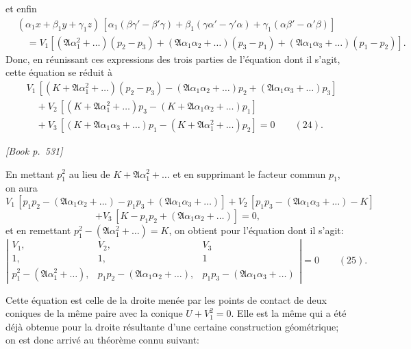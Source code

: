 \documentclass[11pt]{article}
\begin{document}
et enfin
\begin{align*}
&(\alpha_{1}x + \beta_{1}y + \gamma_{1}z)\,[\alpha_{1}(\beta\gamma' - \beta'\gamma) + \beta_{1}(\gamma\alpha' - \gamma'\alpha) + \gamma_{1}(\alpha\beta' - \alpha'\beta)]\\
&\quad = V_{1}[(\mathfrak{A}\alpha_{1}^{2} + \dots)(p_{2} - p_{3}) + (\mathfrak{A}\alpha_{1}\alpha_{2} + \dots)(p_{3} - p_{1}) + (\mathfrak{A}\alpha_{1}\alpha_{3} + \dots)(p_{1} - p_{2})].
\end{align*}
Donc, en r\'eunissant ces expressions des trois parties de l'\'equation dont il s'agit, cette \'equation se r\'eduit \`a
\begin{align*}
&V_{1}\,[(K + \mathfrak{A}\alpha_{1}^{2} + \dots)(p_{2} - p_{3}) - (\mathfrak{A}\alpha_{1}\alpha_{2} + \dots)p_{2} + (\mathfrak{A}\alpha_{1}\alpha_{3} + \dots)p_{3}]\\
&\quad + V_{2}\,[(K + \mathfrak{A}\alpha_{1}^{2} + \dots)p_{3} - (K + \mathfrak{A}\alpha_{1}\alpha_{2} + \dots)p_{1}]\\
&\quad + V_{3}\,[(K + \mathfrak{A}\alpha_{1}\alpha_{3} + \dots)p_{1} - (K + \mathfrak{A}\alpha_{1}^{2} + \dots)p_{2}] = 0\qquad (24).
\end{align*}

\medskip
\noindent\textit{[Book p.~531]}\hfill

\smallskip

\noindent En mettant $p_{1}^{2}$ au lieu de $K + \mathfrak{A}\alpha_{1}^{2} + \dots$ et en supprimant le facteur commun $p_{1}$, on aura
\[
V_{1}\,[p_{1}p_{2} - (\mathfrak{A}\alpha_{1}\alpha_{2} + \dots) - p_{1}p_{3} + (\mathfrak{A}\alpha_{1}\alpha_{3} + \dots)] + V_{2}\,[p_{1}p_{3} - (\mathfrak{A}\alpha_{1}\alpha_{3} + \dots) - K]
\]
\[
+ V_{3}\,[K - p_{1}p_{2} + (\mathfrak{A}\alpha_{1}\alpha_{2} + \dots)] = 0,
\]
et en remettant $p_{1}^{2} - (\mathfrak{A}\alpha_{1}^{2} + \dots) = K$, on obtient pour l'\'equation dont il s'agit:
\[
\left|\begin{array}{ccc}
V_{1}, & V_{2}, & V_{3} \\
1, & 1, & 1 \\
p_{1}^{2} - (\mathfrak{A}\alpha_{1}^{2} + \dots), & p_{1}p_{2} - (\mathfrak{A}\alpha_{1}\alpha_{2} + \dots), & p_{1}p_{3} - (\mathfrak{A}\alpha_{1}\alpha_{3} + \dots)
\end{array}\right| = 0\qquad (25).
\]

Cette \'equation est celle de la droite men\'ee par les points de contact de deux coniques de la m\^eme paire avec la conique $U + V_{1}^{2} = 0$. Elle est la m\^eme qui a \'et\'e d\'ej\`a obtenue pour la droite r\'esultante d'une certaine construction g\'eom\'etrique; on est donc arriv\'e au th\'eor\`eme connu suivant:
\end{document}
